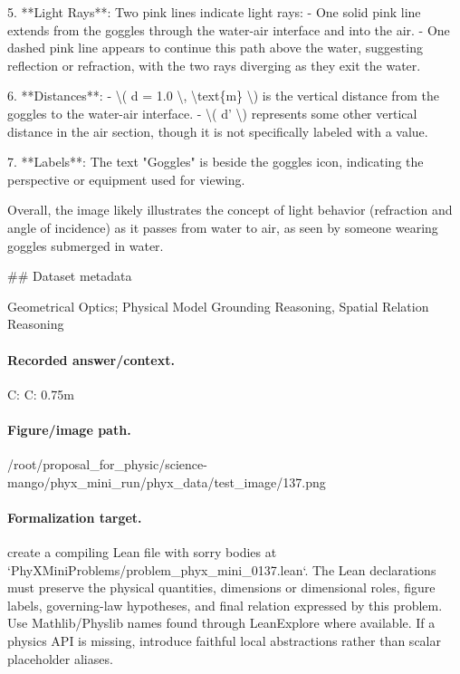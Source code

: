 5. **Light Rays**: Two pink lines indicate light rays:
   - One solid pink line extends from the goggles through the water-air interface and into the air.
   - One dashed pink line appears to continue this path above the water, suggesting reflection or refraction, with the two rays diverging as they exit the water.

6. **Distances**:
   - \textbackslash{}( d = 1.0 \textbackslash{}, \textbackslash{}text\{m\} \textbackslash{}) is the vertical distance from the goggles to the water-air interface.
   - \textbackslash{}( d' \textbackslash{}) represents some other vertical distance in the air section, though it is not specifically labeled with a value.

7. **Labels**: The text "Goggles" is beside the goggles icon, indicating the perspective or equipment used for viewing.

Overall, the image likely illustrates the concept of light behavior (refraction and angle of incidence) as it passes from water to air, as seen by someone wearing goggles submerged in water.

\#\# Dataset metadata

Geometrical Optics; Physical Model Grounding Reasoning, Spatial Relation Reasoning

\paragraph{Recorded answer/context.}
C: C: 0.75m

\paragraph{Figure/image path.}
/root/proposal\_for\_physic/science-mango/phyx\_mini\_run/phyx\_data/test\_image/137.png

\paragraph{Formalization target.}
create a compiling Lean file with sorry bodies at `PhyXMiniProblems/problem\_phyx\_mini\_0137.lean`. The Lean declarations must preserve the physical quantities, dimensions or dimensional roles, figure labels, governing-law hypotheses, and final relation expressed by this problem.
Use Mathlib/Physlib names found through LeanExplore where available. If a physics API is missing, introduce faithful local abstractions rather than scalar placeholder aliases.

